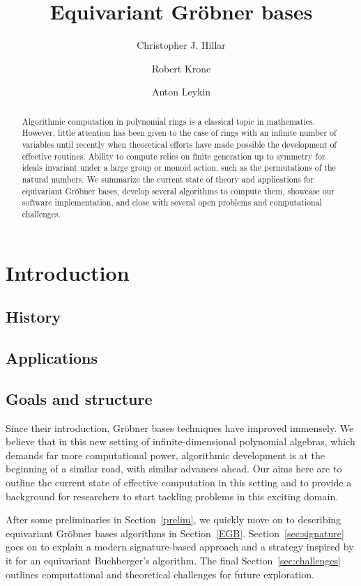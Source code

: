 \documentclass[]{aspm}
\title[Equivariant Gr\"obner bases]{Equivariant Gr\"obner bases}
\author[C.~Hillar]{Christopher J. Hillar}
\author[R.~Krone]{Robert Krone}
\author[A. Leykin]{Anton Leykin}
\begin{document}
\begin{abstract}
Algorithmic computation in polynomial rings is a classical topic in mathematics. However, little attention has been given to the case of rings with an infinite number of variables until recently when theoretical efforts have made possible the development of effective routines. Ability to compute relies on finite generation up to symmetry for ideals invariant under a large group or monoid action, such as the permutations of the natural numbers. We summarize the current state of theory and applications for equivariant Gr\"obner bases, develop several algorithms to compute them, showcase our software implementation, and close with several open problems and computational challenges.
\end{abstract}

\maketitle 
\section{Introduction}
\subsection{History}



\subsection{Applications}



\subsection{Goals and structure}

Since their introduction, Gr\"obner bases techniques have improved immensely.  We believe that in this new setting of infinite-dimensional polynomial algebras, which demands far more computational power, algorithmic development is at the beginning of a similar road, with similar advances ahead. Our aims here are to outline the current state of effective computation in this setting and to provide a background for researchers to start tackling problems in this exciting  domain. 

After some preliminaries in Section~\ref{prelim}, we quickly move on to describing equivariant Gr\"obner bases algorithms in Section~\ref{EGB}.  Section~\ref{sec:signature} goes on to explain a modern signature-based approach and a strategy inspired by it for an equivariant Buchberger's algorithm. The final Section~\ref{sec:challenges} outlines computational and theoretical challenges for future exploration.
\end{document}
